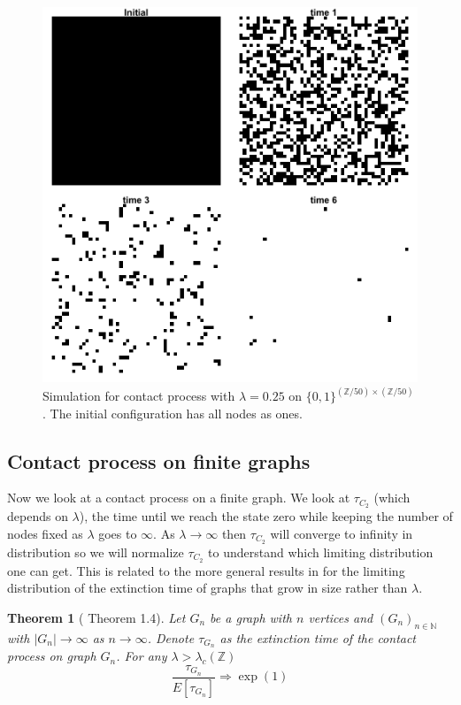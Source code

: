 \documentclass{article}
\theoremstyle{plain}
\newtheorem{theorem}{Theorem}[section]
\theoremstyle{definition}
\theoremstyle{remark}
\numberwithin{equation}{section}
\newcommand{\N}{\mathbb{N}}
\newcommand{\Z}{\mathbb{Z}}
\begin{document}
\begin{figure}[H]
  \centering
    \includegraphics[width=.80\textwidth]{figures/contact_simulation_torus_25_below_crit.png}
   \caption{Simulation for contact process with $\lambda = 0.25$ on $\{0,1\}^{(\Z/50) \times (\Z/50)}$. The initial configuration has all nodes as ones.}
  \label{fig:contact_sim_torus_below_crit.png}
\end{figure}

\subsection{Contact process on finite graphs}

Now we look at a contact process on a finite graph.
We look at $\tau_{C_2}$ (which depends on $\lambda$), the time until we reach the state zero while keeping the number of nodes fixed as $\lambda$ goes to $\infty$.
As $\lambda \to \infty$ then $\tau_{C_2}$ will converge to infinity in distribution so we will normalize $\tau_{C_2}$ to understand which limiting distribution one can get. This is related to the more general results in \cite{schapira2017} for the limiting distribution of the extinction time of graphs that grow in size rather than $\lambda$.

\begin{theorem}[\cite{schapira2017} Theorem 1.4]
Let $G_n$ be a graph with $n$ vertices and $(G_n)_{n \in \N}$ with $|G_n| \to \infty$ as $n \to \infty$.
Denote $\tau_{G_n}$ as the extinction time of the contact process on graph $G_n$.
For any $\lambda > \lambda_c(\Z)$
$$
\frac{\tau_{G_n}}{E[\tau_{G_n}]} \Rightarrow \exp(1)
$$
\end{theorem}
\end{document}
